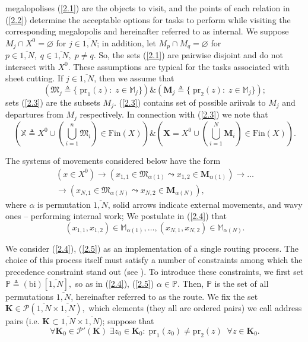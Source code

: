 \documentclass[numbers,sort&compress]{IntechOpen-Book}%
\begin{document}
megalopolises  (\ref{2.1})
are the objects to visit,
and the points of each relation in  (\ref{2.2})
determine the acceptable options for tasks to perform
while visiting the corresponding megalopolis
and hereinafter referred to as internal.
We suppose
$M_j \cap X^0 = \varnothing$
for
$j \in \overline{1,N}$;
in addition, let
$M_p \cap M_q = \varnothing$
for
$p \in \overline{1,N},\;q \in \overline{1,N},\;p \ne q$.
So,
the sets  (\ref{2.1})
are pairwise disjoint and do not intersect with
$ X ^ 0 $.
These assumptions are typical for the tasks
associated with sheet cutting.
If $j \in \overline{1,N}$,
then we assume that
\begin{equation}\label{2.3}
    (\mathfrak{M}_j {\triangleq}
    \{\;\mathrm{pr}_1(z):\;z \in \mathbb{M}_j\})
    \& (\mathbf{M}_j {\triangleq}
    \{\;\mathrm{pr}_2(z):\;z \in \mathbb{M}_j\})
    ;
\end{equation}
sets  (\ref{2.3})
are the subsets
$M_j$.
 (\ref{2.3})
contains set of possible ariivals to
$M_j$
and departures from $M_j$
respectively.
In connection with
 (\ref{2.3})
we note that
$$
(\mathbb{X} {\triangleq} X^0 \cup
(\bigcup\limits_{i=1}^n \mathfrak{M}_i) \in \mathrm{Fin}(X))
\& (\mathbf{X} = X^0 \cup (\bigcup\limits_{i=1}^N \mathbf{M}_i) \in \mathrm{Fin}(X)).
$$

The systems of movements considered below have the form
\begin{equation}\label{2.4}
  \begin{aligned}
    (x \in X^0)
    \to
    (x_{1,1} \in \mathfrak{M}_{\alpha(1)} \leadsto x_{1,2} \in \mathbf{M}_{\alpha(1)})
    \to \dots \\
    \to
    (x_{N,1} \in \mathfrak{M}_{\alpha(N)} \leadsto x_{N,2} \in \mathbf{M}_{\alpha(N)}),
  \end{aligned}
\end{equation}
where
$\alpha$ is permutation $\overline{1,N}$,
solid arrows indicate external movements,
and wavy ones --  performing internal work;
We postulate in  (\ref{2.4}) that
\begin{equation}\label{2.5}
  (x_{1,1},x_{1,2}) \in \mathbb{M}_{\alpha(1)},
  \dots,
  (x_{N,1},x_{N,2}) \in \mathbb{M}_{\alpha(N)}.
\end{equation}

We consider
 (\ref{2.4}),  (\ref{2.5})
as an implementation of a single routing process.
The choice of this process itself must satisfy
a number of constraints
among which the precedence constraint stand out
(see \cite{10}).
To introduce these constraints,
we first set
$\mathbb{P} {\triangleq} (
  \mathrm{bi})[\overline{1,N}],$
so as in  (\ref{2.4}),  (\ref{2.5})
$\alpha \in \mathbb{P}$.
Then,
$\mathbb{P}$
is the set of all permutations
$\overline{1,N}$,
hereinafter referred to as the route.
We fix the set
$\mathbf{K} \in \mathcal{P}(\overline{1,N} \times \overline{1,N}),$
which elements
(they all are ordered pairs)
we call address pairs
(i.e. $\mathbf{K} \subset \overline{1,N} \times \overline{1,N}$);
suppose that
\begin{equation}\label{2.6}
\forall{\mathbf{K}_0} \in \mathcal{P}'(\mathbf{K})\;\exists{z_0} \in \mathbf{K}_0:\;\mathrm{pr}_1(z_0)
\ne \mathrm{pr}_2(z)\;\;\forall{z} \in \mathbf{K}_0.
\end{equation}
\end{document}
